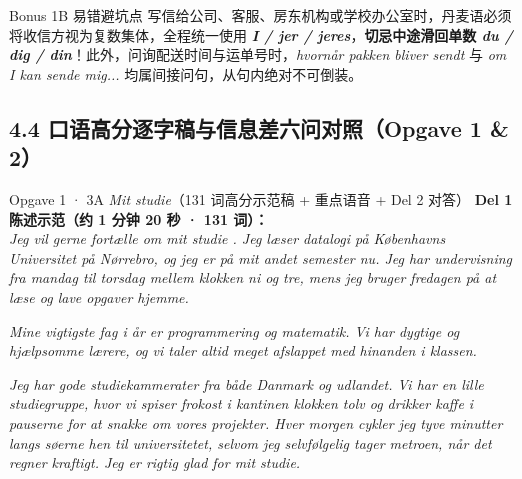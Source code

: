 \begin{tipbox}{Bonus 1B 易错避坑点}
\small
写信给公司、客服、房东机构或学校办公室时，丹麦语必须将收信方视为复数集体，全程统一使用 \textbf{\color{NCDRed}\textit{I / jer / jeres}}，\textbf{切忌中途滑回单数 \textit{du / dig / din}}！此外，问询配送时间与运单号时，\textit{hvornår pakken bliver sendt} 与 \textit{om I kan sende mig...} 均属间接问句，从句内绝对不可倒装。
\end{tipbox}

\subsection*{4.4 口语高分逐字稿与信息差六问对照（Opgave 1 \& 2）}

\begin{tipbox}{Opgave 1 · 3A \textit{Mit studie}（131 词高分示范稿 + 重点语音 + Del 2 对答）}
\small
\textbf{Del 1 陈述示范（约 1 分钟 20 秒 · 131 词）：}\\
\textit{Jeg vil gerne fortælle om mit studie . Jeg læser datalogi på Københavns Universitet  på Nørrebro, og jeg er på mit andet semester nu. Jeg har undervisning fra mandag til torsdag mellem klokken ni og tre, mens jeg bruger fredagen på at læse og lave opgaver hjemme.}

\textit{Mine vigtigste fag i år er programmering og matematik. Vi har dygtige og hjælpsomme  lærere, og vi taler altid meget afslappet med hinanden  i klassen.}

\textit{Jeg har gode studiekammerater  fra både Danmark og udlandet. Vi har en lille studiegruppe, hvor vi spiser frokost i kantinen klokken tolv og drikker kaffe i pauserne for at snakke om vores projekter. Hver morgen cykler jeg tyve minutter langs søerne hen til universitetet, selvom  jeg selvfølgelig tager metroen, når det regner kraftigt. Jeg er rigtig glad for mit studie.}


\end{tipbox}
